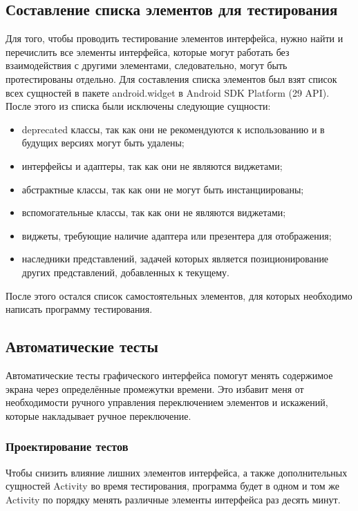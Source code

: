 \documentclass[a4paper,14pt]{extarticle} %
\begin{document}
	\subsection{Составление списка элементов для тестирования}
	
	Для того, чтобы проводить тестирование элементов интерфейса, нужно найти и перечислить все элементы интерфейса, которые могут работать без взаимодействия с другими элементами, следовательно, могут быть протестированы отдельно. Для составления списка элементов был взят список всех сущностей в пакете android.widget в Android SDK Platform (29 API). После этого из списка были исключены следующие сущности:
	\begin{itemize}
		\item deprecated классы, так как они не рекомендуются к использованию и в будущих версиях могут быть удалены;
		\item интерфейсы и адаптеры, так как они не являются виджетами;
		\item абстрактные классы, так как они не могут быть инстанциированы;
		\item вспомогательные классы, так как они не являются виджетами;
		\item виджеты, требующие наличие адаптера или презентера для отображения;
		\item наследники представлений, задачей которых является позиционирование других представлений, добавленных к текущему.
	\end{itemize}
	
	После этого остался список самостоятельных элементов, для которых необходимо написать программу тестирования.
	
	\subsection{Автоматические тесты}
	
	Автоматические тесты графического интерфейса помогут менять содержимое экрана через определённые промежутки времени. Это избавит меня от необходимости ручного управления переключением элементов и искажений, которые накладывает ручное переключение.
	
	\subsubsection{Проектирование тестов}
	
	Чтобы снизить влияние лишних элементов интерфейса, а также дополнительных сущностей Activity во время тестирования, программа будет в одном и том же Activity по порядку менять различные элементы интерфейса раз десять минут.
	
\end{document}
